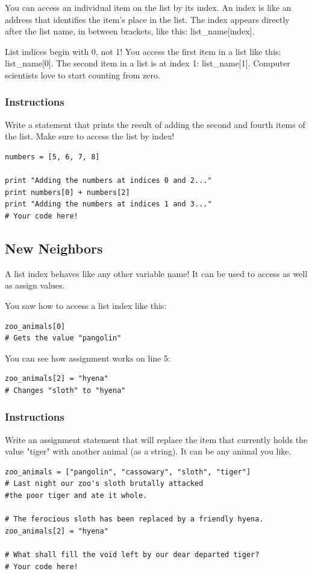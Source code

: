 \documentclass[12pt,a4paper,final,twoside,onecolumn,titlepage]{book}
\begin{document}
You can access an individual item on the list by its index. An index is like an address that identifies the item's place in the list. The index appears directly after the list name, in between brackets, like this: list\_name[index].

List indices begin with 0, not 1! You access the first item in a list like this: list\_name[0]. The second item in a list is at index 1: list\_name[1]. Computer scientists love to start counting from zero.
\subsubsection{Instructions}

Write a statement that prints the result of adding the second and fourth items of the list. Make sure to access the list by index!
\begin{lstlisting}
numbers = [5, 6, 7, 8]

print "Adding the numbers at indices 0 and 2..."
print numbers[0] + numbers[2]
print "Adding the numbers at indices 1 and 3..."
# Your code here!
\end{lstlisting}

\subsection{New Neighbors}

A list index behaves like any other variable name! It can be used to access as well as assign values.

You saw how to access a list index like this:
\begin{lstlisting}
zoo_animals[0]
# Gets the value "pangolin"
\end{lstlisting}
You can see how assignment works on line 5:
\begin{lstlisting}
zoo_animals[2] = "hyena"
# Changes "sloth" to "hyena"
\end{lstlisting}
\subsubsection{Instructions}

Write an assignment statement that will replace the item that currently holds the value "tiger" with another animal (as a string). It can be any animal you like.
\begin{lstlisting}
zoo_animals = ["pangolin", "cassowary", "sloth", "tiger"]
# Last night our zoo's sloth brutally attacked 
#the poor tiger and ate it whole.

# The ferocious sloth has been replaced by a friendly hyena.
zoo_animals[2] = "hyena"

# What shall fill the void left by our dear departed tiger?
# Your code here!

\end{lstlisting}
\end{document}
